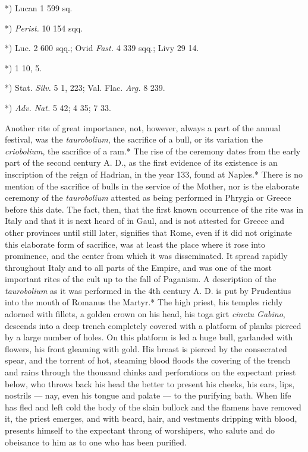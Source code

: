 \documentclass[a4paper, 11pt, oneside, polutonikogreek, english]{article}
\begin{document}
*) Lucan 1 599 sq.

*) \emph{Perist.} 10 154 sqq.

*) Luc. 2 600 sqq.; Ovid \emph{Fast.} 4 339 sqq.; Livy 29 14.

*) 1 10, 5.

*) Stat. \emph{Silv.} 5 1, 223; Val. Flac. \emph{Arg.} 8 239.

*) \emph{Adv. Nat.} 5 42; 4 35; 7 33.

Another rite of great importance, not, however, always a part of the annual festival, was the \emph{taurobolium}, the sacrifice of a bull, or its variation the \emph{criobolium}, the sacrifice of a ram.* The rise of the ceremony dates from the early part of the second century A. D., as the first evidence of its existence is an inscription of the reign of Hadrian, in the year 133, found at Naples.* There is no mention of the sacrifice of bulls in the service of the Mother, nor is the elaborate ceremony of the \emph{taurobolium} attested as being performed in Phrygia or Greece before this date. The fact, then, that the first known occurrence of the rite was in Italy and that it is next heard of in Gaul, and is not attested for Greece and other provinces until still later, signifies that Rome, even if it did not originate this elaborate form of sacrifice, was at least the place where it rose into prominence, and the center from which it was disseminated. It spread rapidly throughout Italy and to all parts of the Empire, and was one of the most important rites of the cult up to the fall of Paganism. A description of the \emph{taurobolium} as it was performed in the 4th century A. D. is put by Prudentius into the mouth of Romanus the Martyr.* The high priest, his temples richly adorned with fillets, a golden crown on his head, his toga girt \emph{cinctu Gabino}, descends into a deep trench completely covered with a platform of planks pierced by a large number of holes. On this platform is led a huge bull, garlanded with flowers, his front gleaming with gold. His breast is pierced by the consecrated spear, and the torrent of hot, steaming blood floods the covering of the trench and rains through the thousand chinks and perforations on the expectant priest below, who throws back his head the better to present his cheeks, his ears, lips, nostrils --- nay, even his tongue and palate --- to the purifying bath. When life has fled and left cold the body of the slain bullock and the flamens have removed it, the priest emerges, and with beard, hair, and vestments dripping with blood, presents himself to the expectant throng of worshipers, who salute and do obeisance to him as to one who has been purified.
\end{document}
